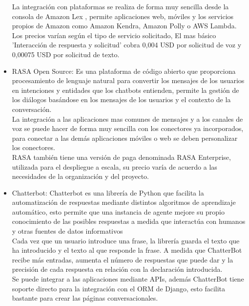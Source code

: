 \begin{itemize}
        La integración con plataformas se realiza de forma muy sencilla desde la consola de Amazon Lex , permite aplicaciones web, móviles y los servicios propios de Amazon como Amazon Kendra, Amazon Polly o AWS Lambda.\\
        Los precios varían según el tipo de servicio solicitado, El mas básico 'Interacción de respuesta y solicitud' cobra 0,004 USD por solicitud de voz y 0,00075 USD por solicitud de texto.\cite{Amazon_Lex}
    \item RASA Open Source:
    Es una plataforma de código abierto que proporciona procesamiento de lenguaje natural para convertir los mensajes de los usuarios en intenciones y entidades que los chatbots entienden, permite la gestión de los diálogos basándose en los mensajes de los usuarios y el contexto de la conversación.\\
    La integración a las aplicaciones mas comunes de mensajes y a los canales de voz se puede hacer de forma muy sencilla con los conectores ya incorporados, para conectar a las demás aplicaciones móviles o web se deben personalizar los conectores.\\
    RASA también tiene una versión de paga denominada RASA Enterprise, utilizada para el despliegue a escala, su precio varía de acuerdo a las necesidades de la organización y del proyecto.\cite{Rasa}
    \item Chatterbot:
    Chatterbot es una librería de Python que facilita la automatización de respuestas mediante  distintos algoritmos de aprendizaje automático, esto permite que una instancia de agente mejore su propio conocimiento de las posibles respuestas a medida que interactúa con humanos y otras fuentes de datos informativos\\
    Cada vez que un usuario introduce una frase, la librería guarda el texto que ha introducido y el texto al que responde la frase. A medida que ChatterBot recibe más entradas, aumenta el número de respuestas que puede dar y la precisión de cada respuesta en relación con la declaración introducida.\\
    Se puede integrar a las aplicaciones mediante APIs, además ChatterBot tiene soporte directo para la integración con el ORM de Django, esto facilita bastante para crear las páginas conversacionales.\cite{Chatterbot}\\
\end{itemize}

